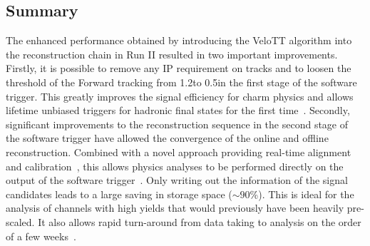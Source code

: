 \subsection{Summary}
\label{sec:up-track-run2:summary}

The enhanced performance obtained by introducing the VeloTT algorithm into the reconstruction chain in Run II resulted in two important improvements. Firstly, it is possible to remove any IP requirement on \velo tracks and to loosen the \pt threshold of the Forward tracking from 1.2\gevc to 0.5\gevc in the first stage of the software trigger. This greatly improves the signal efficiency for charm physics and allows lifetime unbiased triggers for hadronic final states for the first time~\cite{hlt-runII}. Secondly, significant improvements to the reconstruction sequence in the second stage of the software trigger have allowed the convergence of the online and offline reconstruction. Combined with a novel approach providing real-time alignment and calibration~\cite{alignment}, this allows physics analyses to be performed directly on the output of the software trigger~\cite{turbo}. Only writing out the information of the signal candidates leads to a large saving in storage space ($\sim 90$\%). This is ideal for the analysis of channels with high yields that would previously have been heavily pre-scaled. It also allows rapid turn-around from data taking to analysis on the order of a few weeks~\cite{jpsi-em,charm-em}.
